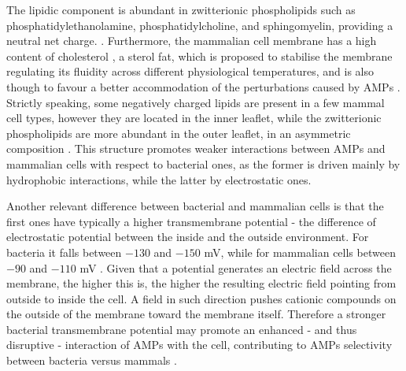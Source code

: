 The lipidic component is abundant in zwitterionic phospholipids such as phosphatidylethanolamine, phosphatidylcholine, and sphingomyelin, providing a neutral net charge. \citep{Spector1985,vanMeer2008}.
%
Furthermore, the mammalian cell membrane has a high content of cholesterol \citep{Yeaman2003, Lai2009}, a sterol fat, which is proposed to stabilise the membrane regulating its fluidity across different physiological temperatures, and is also though to favour a better accommodation of the perturbations caused by AMPs \citep{Zasloff2002}.
%
Strictly speaking, some negatively charged lipids are present in a few mammal cell types, however they are located in the inner leaflet, while the zwitterionic phospholipids are more abundant in the outer leaflet, in an asymmetric composition \citep{vanMeer2008,Matsuzaki2009}.
%
This structure promotes weaker interactions between AMPs and mammalian cells with respect to bacterial ones, as the former is driven mainly by hydrophobic interactions, while the latter by electrostatic ones.

Another relevant difference between bacterial and mammalian cells is that the first ones have typically a higher transmembrane potential - the difference of electrostatic potential between the inside and the outside environment. For bacteria it falls between $-130$ and $-150$ mV, while for mammalian cells between $-90$ and $-110$ mV \citep{Yeaman2003,Matsuzaki2009,Ebenhan2014}.
%
Given that a potential generates an electric field across the membrane, the higher this is, the higher the resulting electric field pointing from outside to inside the cell. A field in such direction pushes cationic compounds on the outside of the membrane toward the membrane itself. Therefore a stronger bacterial transmembrane potential may promote an enhanced - and thus disruptive - interaction of AMPs with the cell, contributing to AMPs selectivity between bacteria versus mammals \citep{Yeaman2003}.


